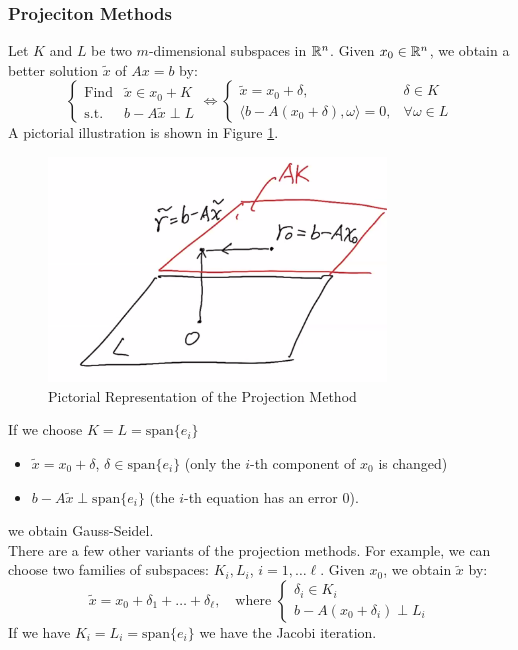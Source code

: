 \documentclass[../main/main.tex]{subfiles}
\begin{document}
\subsubsection{Projeciton Methods}
Let $K$ and $L$ be two $m$-dimensional subspaces in $\mathbb{R} ^{n}$. Given $x_{0} \in \mathbb{R} ^{n}$, we obtain a better solution $\tilde{x}$ of $Ax = b$ by: \[
\begin{cases}
  \text{Find} &\tilde{x}\in x_{0}+K \\
  \text{s.t.} &b-A\tilde{x}\perp L
\end{cases}
\iff
\begin{cases}
 \tilde{x}= x_{0}+\delta , & \delta  \in K \\
 \langle b-A(x_{0}+\delta), \omega \rangle = 0, & \forall \omega  \in L
\end{cases}
\]
A pictorial illustration is shown in Figure \ref{3-2-proj}.
\begin{figure}[ht]
  \centering
  \includegraphics[width=0.8\textwidth]{../images/3-2-proj}
  \caption{Pictorial Representation of the Projection Method \label{3-2-proj} }
\end{figure}


If we choose  $K = L = \text{span}\{ e_{i}\}$
        \begin{itemize}
\item $\tilde{x} = x_{0}+\delta $, $\delta   \in\text{span}\{ e_{i}\} $ (only the $i$-th component of $x_{0}$ is changed)
                \item $b-A\tilde{x} \perp \text{span}\{ e_{i}\}$ (the $i$-th equation has an error $0$).
        \end{itemize}
        we obtain Gauss-Seidel.\\

        There are a few other variants of the projection methods. For example, we can choose two families of subspaces: $K_{i},L_{i}$, $i= 1, \ldots  \ell $. Given $x_{0}$, we obtain $\tilde{x}$ by: \[
          \tilde{x} = x_{0}+\delta_{1}+\ldots +\delta_{\ell}, \quad \text{where }\begin{cases}
            \delta _{i}\in K_{i} \\
            b-A(x_{0}+ \delta_{i})\perp L_{i}
\end{cases}
        \]
        If we have $K_{i}=L_{i}=\text{span}\{ e_{i}\} $ we have the Jacobi iteration.
\end{document}

